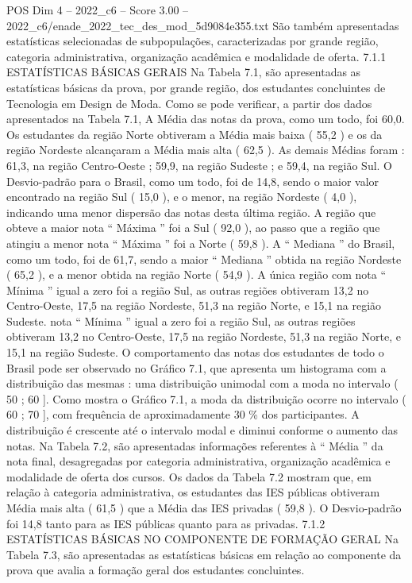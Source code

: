 \begin{textsample}{POS Dim 4 – 2022\_c6 – Score 3.00 – 2022\_c6/enade\_2022\_tec\_des\_mod\_5d9084e355.txt}
São também apresentadas estatísticas selecionadas de subpopulações, caracterizadas por grande região, categoria administrativa, organização acadêmica e modalidade de oferta. 7.1.1 ESTATÍSTICAS BÁSICAS GERAIS Na Tabela 7.1, são apresentadas as estatísticas básicas da prova, por grande região, dos estudantes concluintes de Tecnologia em Design de Moda.
Como se pode verificar, a partir dos dados apresentados na Tabela 7.1, A Média das notas da prova, como um todo, foi 60,0.
Os estudantes da região Norte obtiveram a Média mais baixa ( 55,2 ) e os da região Nordeste alcançaram a Média mais alta ( 62,5 ).
As demais Médias foram : 61,3, na região Centro-Oeste ; 59,9, na região Sudeste ; e 59,4, na região Sul.
O Desvio-padrão para o Brasil, como um todo, foi de 14,8, sendo o maior valor encontrado na região Sul ( 15,0 ), e o menor, na região Nordeste ( 4,0 ), indicando uma menor dispersão das notas desta última região.
A região que obteve a maior nota “ Máxima ” foi a Sul ( 92,0 ), ao passo que a região que atingiu a menor nota “ Máxima ” foi a Norte ( 59,8 ).
A “ Mediana ” do Brasil, como um todo, foi de 61,7, sendo a maior “ Mediana ” obtida na região Nordeste ( 65,2 ), e a menor obtida na região Norte ( 54,9 ).
A única região com nota “ Mínima ” igual a zero foi a região Sul, as outras regiões obtiveram 13,2 no Centro-Oeste, 17,5 na região Nordeste, 51,3 na região Norte, e 15,1 na região Sudeste. nota “ Mínima ” igual a zero foi a região Sul, as outras regiões obtiveram 13,2 no Centro-Oeste, 17,5 na região Nordeste, 51,3 na região Norte, e 15,1 na região Sudeste.
O comportamento das notas dos estudantes de todo o Brasil pode ser observado no Gráfico 7.1, que apresenta um histograma com a distribuição das mesmas : uma distribuição unimodal com a moda no intervalo ( 50 ; 60 ].
Como mostra o Gráfico 7.1, a moda da distribuição ocorre no intervalo ( 60 ; 70 ], com frequência de aproximadamente 30 \% dos participantes.
A distribuição é crescente até o intervalo modal e diminui conforme o aumento das notas.
Na Tabela 7.2, são apresentadas informações referentes à “ Média ” da nota final, desagregadas por categoria administrativa, organização acadêmica e modalidade de oferta dos cursos.
Os dados da Tabela 7.2 mostram que, em relação à categoria administrativa, os estudantes das IES públicas obtiveram Média mais alta ( 61,5 ) que a Média das IES privadas ( 59,8 ).
O Desvio-padrão foi 14,8 tanto para as IES públicas quanto para as privadas. 7.1.2 ESTATÍSTICAS BÁSICAS NO COMPONENTE DE FORMAÇÃO GERAL Na Tabela 7.3, são apresentadas as estatísticas básicas em relação ao componente da prova que avalia a formação geral dos estudantes concluintes.

\end{textsample}
